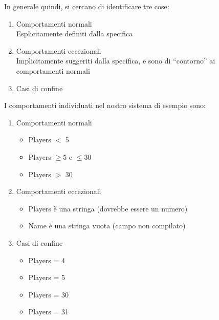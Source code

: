 In generale quindi, si cercano di identificare tre cose: \begin{enumerate}
    \item Comportamenti normali \\ Esplicitamente definiti dalla specifica
    \item Comportamenti eccezionali \\ Implicitamente suggeriti dalla specifica, e sono di ``contorno'' ai comportamenti normali
    \item Casi di confine
\end{enumerate}

I comportamenti individuati nel nostro sistema di esempio sono: \begin{enumerate}
    \item Comportamenti normali \begin{itemize}
        \item Players $<$ 5
        \item Players $\geq 5$ e $\leq 30$
        \item Players $>$ 30
    \end{itemize}
    \item Comportamenti eccezionali \begin{itemize}
        \item Players è una stringa (dovrebbe essere un numero)
        \item Name è una stringa vuota (campo non compilato)
    \end{itemize}
    \item Casi di confine \begin{itemize}
        \item Players = 4
        \item Players = 5
        \item Players = 30
        \item Players = 31
    \end{itemize}
\end{enumerate}